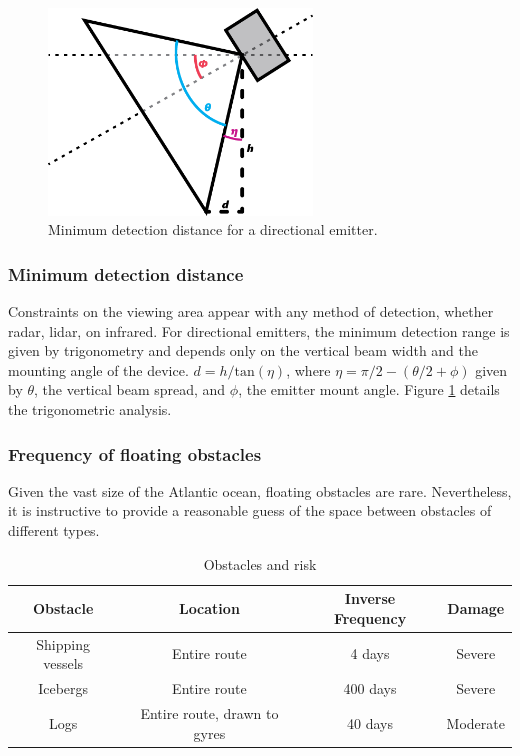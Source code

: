 \begin{figure}[h]
\includegraphics[width=70mm,natwidth=505,natheight=394]{"./image/directional-emitters"}
\caption[Minimum distance to detected obstacle.]{\label{fig:emitter-angle}Minimum detection distance for a directional emitter.}
\end{figure}

\subsubsection{\label{app:minimum-detection-distance}Minimum detection distance}
Constraints on the viewing area appear with any method of detection, whether radar, lidar, on infrared. For directional emitters, the minimum detection range is given by trigonometry and depends only on the vertical beam width and the mounting angle of the device. $d = h/\text{tan}(\eta)$, where $\eta=\pi/2-(\theta/2+\phi)$ given by $\theta$, the vertical beam spread, and $\phi$, the emitter mount angle. Figure \ref{fig:emitter-angle} details the trigonometric analysis.

\subsubsection{\label{app:obstacle-frequency}Frequency of floating obstacles}
Given the vast size of the Atlantic ocean, floating obstacles are rare. Nevertheless, it is instructive to provide a reasonable guess of the space between obstacles of different types.

\begin{table}[h]
\caption{\label{tab:obstacles}Obstacles and risk}
\begin{tabular}{c|c|c|c}

Obstacle & Location & Inverse Frequency & Damage\\[0.6cm]
\hline

Shipping vessels & Entire route & 4 days & Severe \\
Icebergs & Entire route & 400 days & Severe \\
Logs & Entire route, drawn to gyres & 40 days & Moderate \\

\end{tabular}
\end{table}

